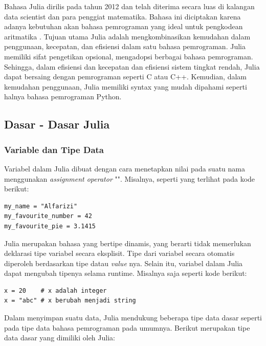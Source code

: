 Bahasa Julia dirilis pada tahun 2012 dan telah diterima secara luas di kalangan data
scientist dan para penggiat matematika. Bahasa ini diciptakan karena adanya
kebutuhan akan bahasa pemrograman yang ideal untuk pengkodean aritmatika \citep{ismiPentingUntukData2021}.
Tujuan utama Julia adalah mengkombinasikan kemudahan dalam penggunaan, kecepatan,
dan efisiensi dalam satu bahasa pemrograman. Julia memiliki sifat pengetikan opsional,
mengadopsi berbagai bahasa pemrograman. Sehingga, dalam efisiensi dan kecepatan
dan efisiensi sistem tingkat rendah, Julia dapat bersaing dengan pemrograman seperti
C atau C++. Kemudian, dalam kemudahan penggunaan, Julia memiliki syntax yang
mudah dipahami seperti halnya bahasa pemrograman Python.


\subsection{Dasar - Dasar Julia}

\subsubsection{Variable dan Tipe Data}

Variabel dalam Julia dibuat dengan cara menetapkan nilai pada suatu nama menggunakan
\emph{assignment operator} "\cw{=}". Misalnya, seperti yang terlihat pada kode berikut:

\begin{lstlisting}
my_name = "Alfarizi"
my_favourite_number = 42
my_favourite_pie = 3.1415
\end{lstlisting}

\noindent
Julia merupakan bahasa yang bertipe dinamis, yang berarti tidak memerlukan deklarasi
tipe variabel secara eksplisit. Tipe dari variabel secara otomatis diperoleh
berdasarkan tipe datau \emph{value} nya. Selain itu, variabel dalam Julia dapat mengubah
tipenya selama runtime. Misalnya saja seperti kode berikut:

\begin{lstlisting}
x = 20    # x adalah integer
x = "abc" # x berubah menjadi string
\end{lstlisting}

\label{basic tipe data julia} Dalam menyimpan suatu data, Julia mendukung
beberapa tipe data dasar seperti pada tipe data bahasa pemrograman pada umumnya.
Berikut merupakan tipe data dasar yang dimiliki oleh Julia:


